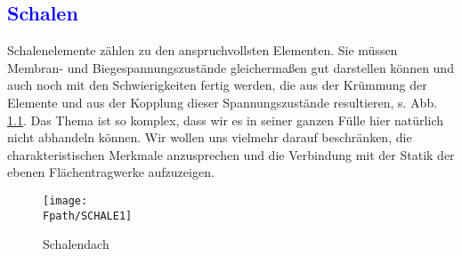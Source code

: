 \setcounter{chapter}{5}
{\textcolor{blue}{\chapter{Schalen}}}\label{Schalen}
Schalenelemente z\"{a}hlen zu den anspruchvollsten Elementen. Sie m\"{u}ssen Membran- und Biegespannungszust\"{a}nde gleicherma{\ss}en gut darstellen k\"{o}nnen und auch noch mit den Schwierigkeiten fertig werden, die aus der Kr\"{u}mmung der Elemente und aus der Kopplung dieser Spannungszust\"{a}nde resultieren, s. Abb. \ref{Schale1}. Das Thema ist so komplex, dass wir es in seiner ganzen F\"{u}lle hier nat\"{u}rlich nicht abhandeln k\"{o}nnen. Wir wollen uns vielmehr darauf beschr\"{a}nken, die charakteristischen Merkmale anzusprechen und die Verbindung mit der Statik der ebenen Fl\"{a}chentragwerke aufzuzeigen.
\begin{figure}[h]
\if {} \sidecaption \fi
\texttt{[image: \\Fpath/SCHALE1]}
\caption{Schalendach}\label{Schale1}
\end{figure}

